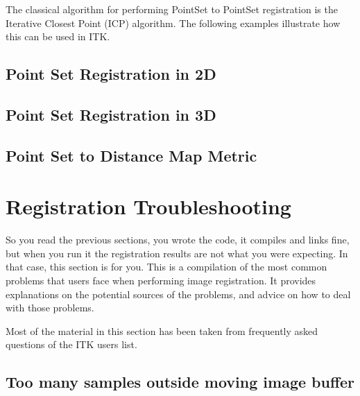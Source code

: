 The classical algorithm for performing PointSet to PointSet registration is the
Iterative Closest Point (ICP) algorithm.  The following examples illustrate how
this can be used in ITK.



\subsection{Point Set Registration in 2D}
\label{sec:PointSetRegistrationIn2D}

\ifitkFullVersion

\fi




\subsection{Point Set Registration in 3D}
\label{sec:PointSetRegistrationIn3D}

\ifitkFullVersion

\fi



\subsection{Point Set to Distance Map Metric}
\label{sec:PointSetToDistanceMapMetric}

\ifitkFullVersion

\fi



\section{Registration Troubleshooting}
So you read the previous sections, you wrote the code, it compiles and links fine,
but when you run it the registration results are not what you were expecting.
In that case, this section is for you. This is a compilation of the most common
problems that users face when performing image registration. It provides explanations
on the potential sources of the problems, and advice on how to deal with those problems.

Most of the material in this section has been taken from frequently asked questions of
the ITK users list.


\subsection{Too many samples outside moving image buffer}


